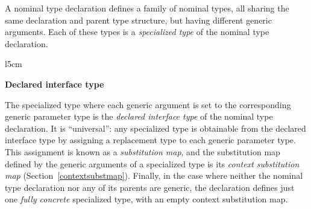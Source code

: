 \documentclass[../generics]{subfiles}
\begin{document}
\medskip

A nominal type declaration defines a family of nominal types, all sharing the same declaration and parent type structure, but having different generic arguments. Each of these types is a \emph{specialized type} of the nominal type declaration.

\begin{wrapfigure}[13]{l}{5cm}
\begin{center}\textbf{Declared interface type}\end{center}
\end{wrapfigure}

\smallskip

The specialized type where each generic argument is set to the corresponding generic parameter type is the \emph{declared interface type} of the nominal type declaration. It is ``universal'': any specialized type is obtainable from the declared interface type by assigning a replacement type to each generic parameter type. This assignment is known as a \emph{substitution map}, and the substitution map defined by the generic arguments of a specialized type is its \emph{context substitution map} (Section~\ref{contextsubstmap}). Finally, in the case where neither the nominal type declaration nor any of its parents are generic, the declaration defines just one \emph{fully concrete} specialized type, with an empty context substitution map.
\end{document}
